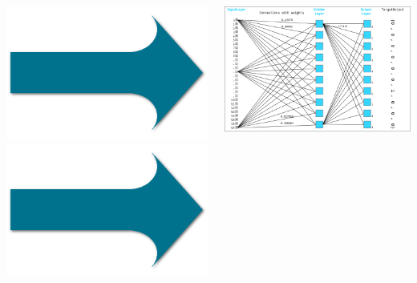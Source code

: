 \documentclass[xcolor=pdftex,dvipsnames,table]{beamer}
\begin{document}
\begin{frame}
\begin{columns}
\begin{column}{0.05\textwidth}
				\includegraphics[width=1\textwidth]{arrow.png}\\
				\includegraphics[width=1\textwidth]{arrow.png}
			\end{column}
			\begin{column}{0.4\textwidth}
				\includegraphics[width=1\textwidth]{nn.png}

\end{column}
\end{columns}
\end{frame}
\end{document}
